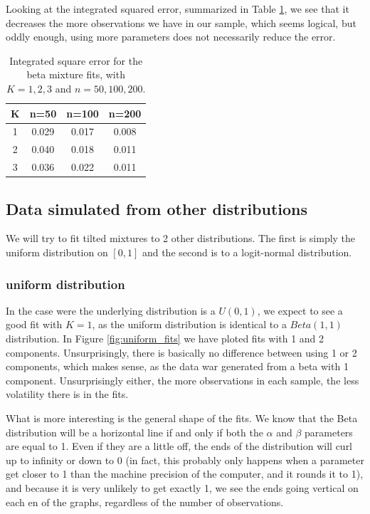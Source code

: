 Looking at the integrated squared error, summarized in Table \ref{table:i2e}, we see that it decreases the more observations we have in our sample, which seems logical, but oddly enough, using more parameters does not necessarily reduce the error.



\begin{table}
\centering
\begin{tabular}{ |c|c|c|c| } 
\hline
K & n=50 & n=100 & n=200 \\
\hline
1 & 0.029 & 0.017 & 0.008 \\
\hline
2 & 0.040 & 0.018 & 0.011\\
\hline
3 & 0.036 & 0.022 & 0.011\\
\hline
\end{tabular}
\caption{Integrated square error for the beta mixture fits, with $K=1,2,3$ and $n=50,100,200$. }
\label{table:i2e}
\end{table}



\subsection{Data simulated from other distributions}
\label{sec:wrongdist}
We will try to fit tilted mixtures to 2 other distributions. The first is simply the uniform distribution on $[0,1]$ and the second is to a logit-normal distribution.

\subsubsection{uniform distribution}
In the case were the underlying distribution is a $U(0,1)$, we expect to see a good fit with $K=1$, as the uniform distribution is identical to a $Beta(1,1)$ distribution. In Figure \ref{fig:uniform_fits} we have ploted fits with 1 and 2 components. Unsurprisingly, there is basically no difference between using 1 or 2 components, which makes sense, as the data war generated from a beta with 1 component. Unsurprisingly either, the more observations in each sample, the less volatility there is in the fits.

What is more interesting is the general shape of the fits. We know that the Beta distribution will be a horizontal line if and only if both the $\alpha$ and $\beta$ parameters are equal to 1. Even if they are a little off, the ends of the distribution will curl up to infinity or down to 0 (in fact, this probably only happens when a parameter get closer to 1 than the machine precision of the computer, and it rounds it to 1), and because it is very unlikely to get exactly 1, we see the ends going vertical on each en of the graphs, regardless of the number of observations.

